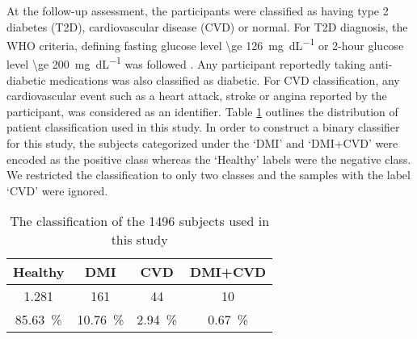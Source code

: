 \documentclass[journal,comsoc]{IEEEtran}
\renewcommand{\^}{\hat}  %
\begin{document}
At the follow-up assessment, the participants were classified as having type 2 diabetes (T2D), cardiovascular disease (CVD) or normal. For T2D diagnosis, the WHO criteria, defining fasting glucose level \SI[round-mode = off,group-separator = {,}]{\ge 126}{\milli\gram\per\deci\liter} or 2-hour glucose level \SI[round-mode = off,group-separator = {,}]{\ge 200}{\milli\gram\per\deci\liter} was followed \cite{wei_effects_1998}. Any participant reportedly taking anti-diabetic medications was also classified as diabetic. For CVD classification, any cardiovascular event such as a heart attack, stroke or angina reported by the participant, was considered as an identifier. Table \ref{tab:patients} outlines the distribution of patient classification used in this study. In order to construct a binary classifier for this study, the subjects categorized under the `{DMI}' and `{DMI+CVD}' were encoded as the positive class whereas the `{Healthy}' labels were the negative class. We restricted the classification to only two classes and the samples with the label `{CVD}' were ignored.
%
\begin{table}[!h]
  \centering
  \renewcommand{\arraystretch}{1.3}
  \caption{The classification of the \num[group-minimum-digits=4, group-separator = {,}]{1496} subjects used in this study}
  \centering
  \begin{tabular}{c c c c}
    \toprule
    Healthy &  DMI & CVD & DMI+CVD\\
    \midrule \midrule
    \num[group-minimum-digits=4, group-separator = {,}]{1,281} & \num{161} & \num{44} & \num{10}\\
    \SI{85.63}{\percent} & \SI{10.76}{\percent} & \SI[round-precision=3]{2.94}{\percent} & \SI[round-precision=2]{0.67}{\percent} \\
    \bottomrule
  \end{tabular}
  \label{tab:patients}
\end{table}
%
\end{document}
